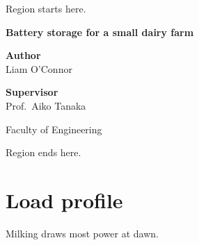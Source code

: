 \documentclass[11pt]{report}
\begin{document}
Region starts here.

\begin{titlepage}
\centering
\vspace*{30mm}
{\LARGE\bfseries Battery storage for a small dairy farm\par}
\vspace{20mm}
\begin{minipage}[t]{0.45\linewidth}
\raggedright
\textbf{Author}\\
Liam O'Connor
\end{minipage}\hfill
\begin{minipage}[t]{0.45\linewidth}
\raggedleft
\textbf{Supervisor}\\
Prof.\ Aiko Tanaka
\end{minipage}
\vfill
{\large Faculty of Engineering\par}
\end{titlepage}

Region ends here.

\chapter{Load profile}
Milking draws most power at dawn.
\end{document}
